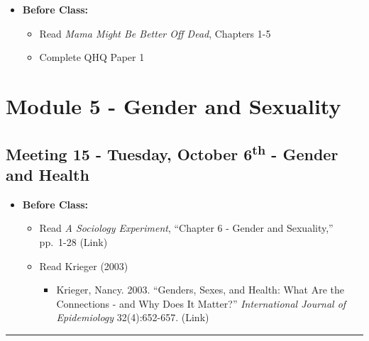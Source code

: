 \documentclass[
]{book}
\providecommand{\tightlist}{%
  \setlength{\itemsep}{0pt}\setlength{\parskip}{0pt}}
\begin{document}
\begin{itemize}
\tightlist
\item
  \textbf{Before Class:}

  \begin{itemize}
  \tightlist
  \item
    Read \emph{Mama Might Be Better Off Dead}, Chapters 1-5
  \item
    Complete QHQ Paper 1
  \end{itemize}
\end{itemize}

\newpage

\hypertarget{module-5---gender-and-sexuality}{%
\section{Module 5 - Gender and Sexuality}\label{module-5---gender-and-sexuality}}

\hypertarget{meeting-15---tuesday-october-6th---gender-and-health}{%
\subsection*{\texorpdfstring{Meeting 15 - Tuesday, October 6\textsuperscript{th} - Gender and Health}{Meeting 15 - Tuesday, October 6th - Gender and Health}}\label{meeting-15---tuesday-october-6th---gender-and-health}}

\begin{itemize}
\tightlist
\item
  \textbf{Before Class:}

  \begin{itemize}
  \tightlist
  \item
    Read \emph{A Sociology Experiment}, ``Chapter 6 - Gender and Sexuality,'' pp.~1-28 (Link)
  \item
    Read Krieger (2003)

    \begin{itemize}
    \tightlist
    \item
      Krieger, Nancy. 2003. ``Genders, Sexes, and Health: What Are the Connections - and Why Does It Matter?'' \emph{International Journal of Epidemiology} 32(4):652-657. (Link)
    \end{itemize}
  \end{itemize}
\end{itemize}

\begin{center}\rule{0.5\linewidth}{0.5pt}\end{center}
\end{document}
